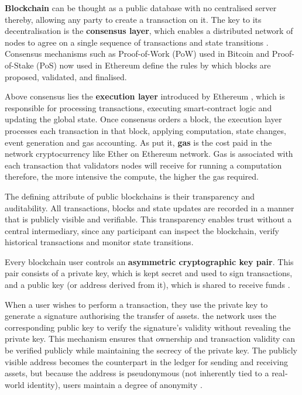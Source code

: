 \documentclass[12pt,a4paper]{article}
\begin{document}
\textbf{Blockchain} can be thought as a public database with no centralised server thereby, allowing any party to create a transaction on it. The key to its decentralisation is the \textbf{consensus layer}, which enables a distributed network of nodes to agree on a single sequence of transactions and state transitions \parencite{abraham2017blockchain}. Consensus mechanisms such as Proof-of-Work (PoW) used in Bitcoin \parencite{bitcoin} and Proof-of-Stake (PoS) now used in Ethereum \parencite{ethereum} define the rules by which blocks are proposed, validated, and finalised.

Above consensus lies the \textbf{execution layer} introduced by Ethereum \parencite{ethereum}, which is responsible for processing transactions, executing smart-contract logic and updating the global state. Once consensus orders a block, the execution layer processes each transaction in that block, applying computation, state changes, event generation and gas accounting. As \textcite{masla2021reduction} put it, \textbf{gas} is the cost paid in the network cryptocurrency like Ether on Ethereum network. Gas is associated with each transaction that validators nodes will receive for running a computation therefore, the more intensive the compute, the higher the gas required. 

The defining attribute of public blockchains is their transparency and auditability. All transactions, blocks and state updates are recorded in a manner that is publicly visible and verifiable. This transparency enables trust without a central intermediary, since any participant can inspect the blockchain, verify historical transactions and monitor state transitions. 

Every blockchain user controls an \textbf{asymmetric cryptographic key pair}. This pair consists of a private key, which is kept secret and used to sign transactions, and a public key (or address derived from it), which is shared to receive funds \parencite{aydar2019private}. 

When a user wishes to perform a transaction, they use the private key to generate a signature authorising the transfer of assets. the network uses the corresponding public key to verify the signature’s validity without revealing the private key. This mechanism ensures that ownership and transaction validity can be verified publicly while maintaining the secrecy of the private key. The publicly visible address becomes the counterpart in the ledger for sending and receiving assets, but because the address is pseudonymous (not inherently tied to a real‐world identity), users maintain a degree of anonymity \parencite{JAMWAL2024104019}.
\end{document}
